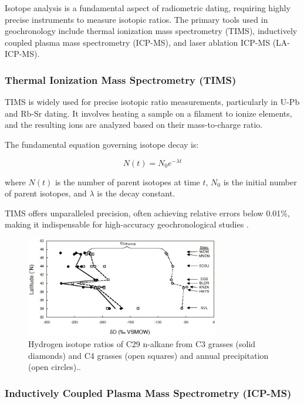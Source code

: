 \documentclass{article}
\begin{document}
Isotope analysis is a fundamental aspect of radiometric dating, requiring highly precise instruments to measure isotopic ratios. The primary tools used in geochronology include thermal ionization mass spectrometry (TIMS), inductively coupled plasma mass spectrometry (ICP-MS), and laser ablation ICP-MS (LA-ICP-MS).

\subsubsection*{Thermal Ionization Mass Spectrometry (TIMS)}

TIMS is widely used for precise isotopic ratio measurements, particularly in U-Pb and Rb-Sr dating. It involves heating a sample on a filament to ionize elements, and the resulting ions are analyzed based on their mass-to-charge ratio.

The fundamental equation governing isotope decay is:

\begin{equation}
N(t) = N_0 e^{-\lambda t}
\end{equation}

where \( N(t) \) is the number of parent isotopes at time \( t \), \( N_0 \) is the initial number of parent isotopes, and \( \lambda \) is the decay constant.

TIMS offers unparalleled precision, often achieving relative errors below 0.01\%, making it indispensable for high-accuracy geochronological studies \cite{Schoene2006TIMS}.

\begin{figure}[htbp]
    \centering
    \includegraphics[width=0.75\textwidth]{Hydrogen_isotope.jpg}
    \caption{ Hydrogen isotope ratios of C29 n-alkane from C3 grasses (solid diamonds) and C4 grasses (open squares) and annual precipitation (open circles).\cite{Schoene2006TIMS}.}
    \label{fig:Hydrogen_isotope}
\end{figure}

\subsubsection*{Inductively Coupled Plasma Mass Spectrometry (ICP-MS)}
\end{document}
